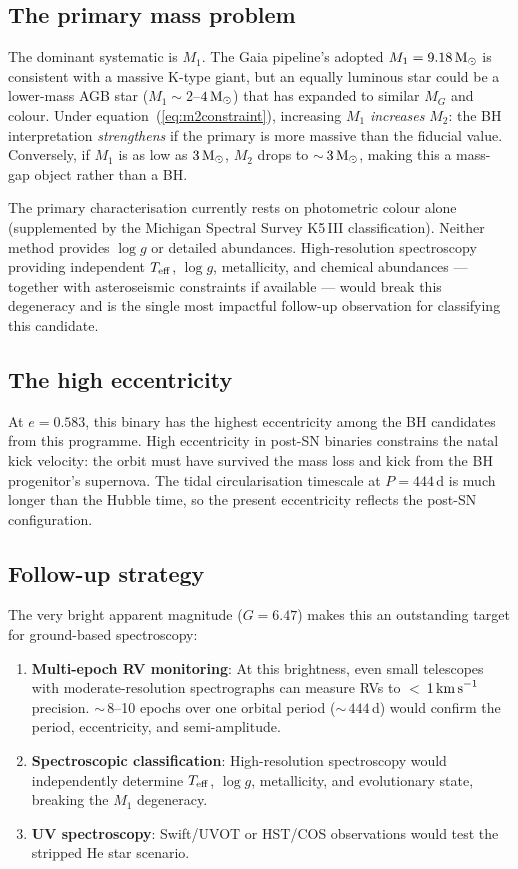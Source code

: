 \documentclass[usenatbib,fleqn]{mnras}
\newcommand{\Msun}{{\rm M}_\odot}
\newcommand{\kms}{{\rm km\,s}^{-1}}
\begin{document}
\subsection{The primary mass problem}

The dominant systematic is $M_1$.  The Gaia pipeline's adopted
$M_1 = 9.18\,\Msun$ is consistent with a massive K-type giant,
but an equally luminous star could be a lower-mass AGB star
($M_1 \sim 2$--$4\,\Msun$) that has expanded to similar $M_G$
and colour.  Under equation~(\ref{eq:m2constraint}), increasing
$M_1$ \emph{increases} $M_2$: the BH interpretation
\emph{strengthens} if the primary is more massive than the
fiducial value.  Conversely, if $M_1$ is as low as
$3\,\Msun$, $M_2$ drops to $\sim$\,$3\,\Msun$, making this a
mass-gap object rather than a BH.

The primary characterisation currently rests on photometric
colour alone (supplemented by the 
Michigan Spectral Survey K5\,III classification).  Neither
method provides $\log g$ or detailed abundances.
High-resolution spectroscopy providing independent
$T_{\rm eff}$, $\log g$, metallicity, and chemical abundances ---
together with asteroseismic constraints if available --- would
break this degeneracy and is the single most impactful
follow-up observation for classifying this candidate.

\subsection{The high eccentricity}

At $e = 0.583$, this binary has the highest eccentricity among the
BH candidates from this programme.  High eccentricity in post-SN
binaries constrains the natal kick velocity: the orbit must have
survived the mass loss and kick from the BH progenitor's supernova.
The tidal circularisation timescale at $P = 444$\,d is much longer
than the Hubble time, so the present eccentricity reflects the
post-SN configuration.

\subsection{Follow-up strategy}
\label{sec:followup}

The very bright apparent magnitude ($G = 6.47$) makes this an
outstanding target for ground-based spectroscopy:
\begin{enumerate}
\item \textbf{Multi-epoch RV monitoring}: At this brightness,
  even small telescopes with moderate-resolution spectrographs can
  measure RVs to $<$\,$1\,\kms$ precision.  $\sim$\,8--10 epochs
  over one orbital period ($\sim$\,$444$\,d) would confirm the
  period, eccentricity, and semi-amplitude.
\item \textbf{Spectroscopic classification}: High-resolution
  spectroscopy would independently determine $T_{\rm eff}$,
  $\log g$, metallicity, and evolutionary state, breaking the
  $M_1$ degeneracy.
\item \textbf{UV spectroscopy}: Swift/UVOT or HST/COS observations
  would test the stripped He star scenario.
\end{enumerate}
\end{document}
